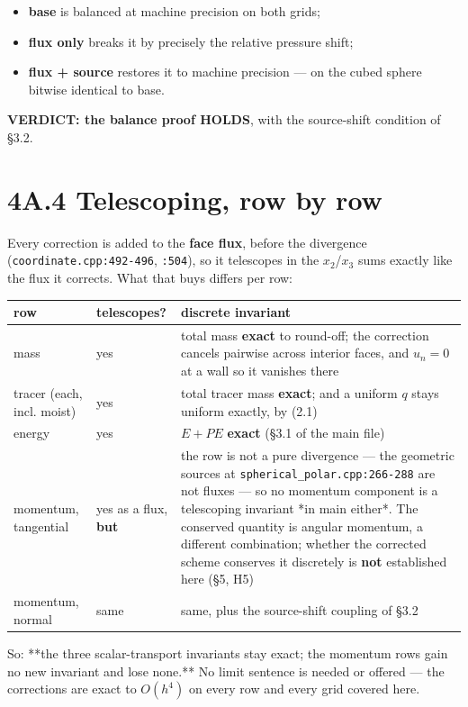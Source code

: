 \documentclass[11pt,a4paper]{article}
\begin{document}
\begin{itemize}
\item \textbf{base} is balanced at machine precision on both grids;
\item \textbf{flux only} breaks it by precisely the relative pressure shift;
\item \textbf{flux + source} restores it to machine precision — on the cubed sphere
  bitwise identical to base.
\end{itemize}

\textbf{VERDICT: the balance proof HOLDS}, with the source-shift condition of §3.2.

\hrulefill

\section*{4A.4 Telescoping, row by row}

Every correction is added to the \textbf{face flux}, before the divergence
(\texttt{coordinate.cpp:492-496}, \texttt{:504}), so it telescopes in the $x_2$/$x_3$ sums
exactly like the flux it corrects. What that buys differs per row:

\begin{longtable}{lll}
\toprule
row & telescopes? & discrete invariant \\
\midrule
mass & yes & total mass \textbf{exact} to round-off; the correction cancels pairwise across interior faces, and $u_n=0$ at a wall so it vanishes there \\
tracer (each, incl. moist) & yes & total tracer mass \textbf{exact}; and a uniform $q$ stays uniform exactly, by (2.1) \\
energy & yes & $E+PE$ \textbf{exact} (§3.1 of the main file) \\
momentum, tangential & yes as a flux, \textbf{but} & the row is not a pure divergence — the geometric sources at \texttt{spherical\_polar.cpp:266-288} are not fluxes — so no momentum component is a telescoping invariant *in main either*. The conserved quantity is angular momentum, a different combination; whether the corrected scheme conserves it discretely is \textbf{not} established here (§5, H5) \\
momentum, normal & same & same, plus the source-shift coupling of §3.2 \\
\bottomrule
\end{longtable}

So: **the three scalar-transport invariants stay exact; the momentum rows gain
no new invariant and lose none.** No limit sentence is needed or offered —
the corrections are exact to $O(h^4)$ on every row and every grid covered here.
\end{document}
